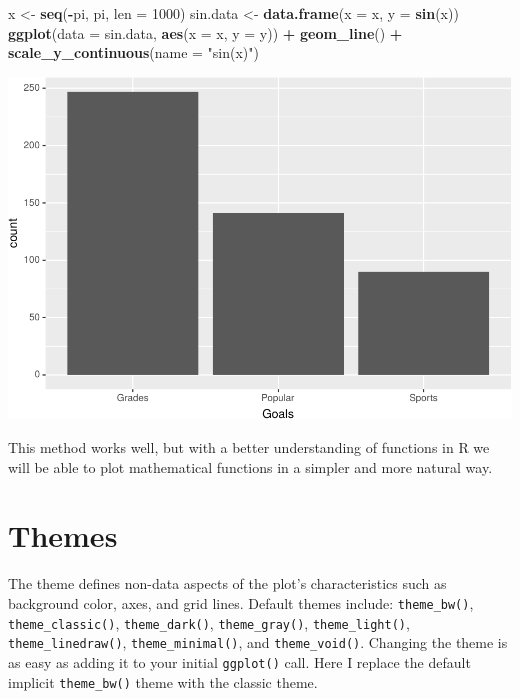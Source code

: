 \documentclass[]{krantz}
\makeatletter
\newenvironment{Shaded}{\begin{snugshade}}{\end{snugshade}}
\newcommand{\DataTypeTok}[1]{\textcolor[rgb]{0.27,0.27,0.27}{#1}}
\newcommand{\DecValTok}[1]{\textcolor[rgb]{0.06,0.06,0.06}{#1}}
\newcommand{\KeywordTok}[1]{\textcolor[rgb]{0.27,0.27,0.27}{\textbf{#1}}}
\newcommand{\NormalTok}[1]{#1}
\newcommand{\OperatorTok}[1]{\textcolor[rgb]{0.43,0.43,0.43}{\textbf{#1}}}
\newcommand{\StringTok}[1]{\textcolor[rgb]{0.5,0.5,0.5}{#1}}
\newenvironment{kframe}{%
\medskip{}
\setlength{\fboxsep}{.8em}
 \def\at@end@of@kframe{}%
 \ifinner\ifhmode%
  \def\at@end@of@kframe{\end{minipage}}%
  \begin{minipage}{\columnwidth}%
 \fi\fi%
 \def\FrameCommand##1{\hskip\@totalleftmargin \hskip-\fboxsep
 \colorbox{shadecolor}{##1}\hskip-\fboxsep
     \hskip-\linewidth \hskip-\@totalleftmargin \hskip\columnwidth}%
 \MakeFramed {\advance\hsize-\width
   \@totalleftmargin\z@ \linewidth\hsize
   \@setminipage}}%
 {\par\unskip\endMakeFramed%
 \at@end@of@kframe}
\renewenvironment{Shaded}{\begin{kframe}}{\end{kframe}}
\makeatother
\begin{document}
\begin{Shaded}
\begin{Highlighting}[]
\NormalTok{x <-}\StringTok{ }\KeywordTok{seq}\NormalTok{(}\OperatorTok{-}\NormalTok{pi, pi, }\DataTypeTok{len =} \DecValTok{1000}\NormalTok{)}
\NormalTok{sin.data <-}\StringTok{ }\KeywordTok{data.frame}\NormalTok{(}\DataTypeTok{x =}\NormalTok{ x, }\DataTypeTok{y =} \KeywordTok{sin}\NormalTok{(x))}
\KeywordTok{ggplot}\NormalTok{(}\DataTypeTok{data =}\NormalTok{ sin.data, }\KeywordTok{aes}\NormalTok{(}\DataTypeTok{x =}\NormalTok{ x, }\DataTypeTok{y =}\NormalTok{ y)) }\OperatorTok{+}\StringTok{ }\KeywordTok{geom_line}\NormalTok{() }\OperatorTok{+}\StringTok{ }
\StringTok{    }\KeywordTok{scale_y_continuous}\NormalTok{(}\DataTypeTok{name =} \StringTok{"sin(x)"}\NormalTok{)}
\end{Highlighting}
\end{Shaded}

\includegraphics{bookdown_files/figure-latex/unnamed-chunk-80-1.pdf}

This method works well, but with a better understanding of functions in R we will be able to plot mathematical functions in a simpler and more natural way.

\hypertarget{themes}{%
\section{Themes}\label{themes}}

The theme defines non-data aspects of the plot's characteristics such as background color, axes, and grid lines. Default themes include: \texttt{theme\_bw()}, \texttt{theme\_classic()}, \texttt{theme\_dark()}, \texttt{theme\_gray()}, \texttt{theme\_light()}, \texttt{theme\_linedraw()}, \texttt{theme\_minimal()}, and \texttt{theme\_void()}. Changing the theme is as easy as adding it to your initial \texttt{ggplot()} call. Here I replace the default implicit \texttt{theme\_bw()} theme with the classic theme.
\end{document}
